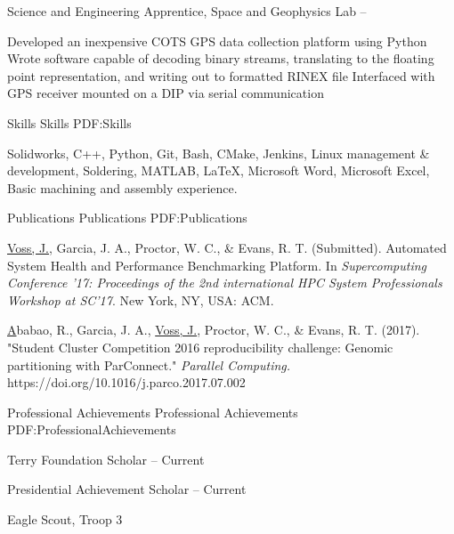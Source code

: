 \documentclass[letterpaper,MMMyyyy,nonstopmode]{simpleresumecv}
\begin{document}
\begin{Body}
\Gap
\BulletItem
Science and Engineering Apprentice, Space and Geophysics Lab
\hfill
{} --
\begin{Detail}
\SubBulletItem
Developed an inexpensive COTS GPS data collection platform using Python
\SubBulletItem
Wrote software capable of decoding binary streams, translating to the floating point \newline
representation, and writing out to formatted RINEX file
\SubBulletItem
Interfaced with GPS receiver mounted on a DIP via serial communication
\end{Detail}



\Section
{Skills}
{Skills}
{PDF:Skills}

\Entry
Solidworks,
C++, 
Python, 
Git, 
Bash,
CMake,
Jenkins,
Linux management \& development, 
Soldering,
MATLAB,
\LaTeX,
Microsoft Word,
Microsoft Excel,
Basic machining and assembly experience.


\Section
{Publications}
{Publications}
{PDF:Publications}

\Entry
\underline{Voss, J.}, Garcia, J. A., Proctor, W. C., \& Evans, R. T.
(Submitted). Automated System Health and Performance Benchmarking Platform.
In \textit{Supercomputing Conference ’17: Proceedings of the 2nd international
HPC System Professionals Workshop at SC’17}. New York, NY, USA: ACM.
\Gap

\Entry
\href{https://doi.org/10.1016/j.parco.2017.07.002}
Ababao, R., Garcia, J. A., \underline{Voss, J.}, Proctor, W. C., \& Evans, R. T. (2017). "Student Cluster Competition 2016 reproducibility challenge: Genomic partitioning with ParConnect." \textit{Parallel Computing.} https://doi.org/10.1016/j.parco.2017.07.002


\Section
{Professional Achievements}
{Professional Achievements}
{PDF:ProfessionalAchievements}

\Entry
Terry Foundation Scholar
\hfill
{}--
Current

\Entry
Presidential Achievement Scholar
\hfill
{}--
Current

\Entry
Eagle Scout, Troop 3
\hfill
{}

\end{Body}
\end{document}
